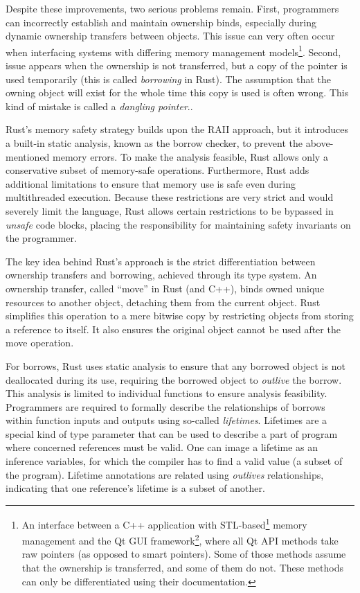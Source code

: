 \documentclass[
  11pt,
  twoside,symmetric]{report}
\DeclareRobustCommand{\href}[2]{#2\footnote{\url{#1}}}
\begin{document}
Despite these improvements, two serious problems remain. First,
programmers can incorrectly establish and maintain ownership binds,
especially during dynamic ownership transfers between objects. This
issue can very often occur when interfacing systems with differing
memory management models\footnote{An interface between a C++ application
  with
  \href{https://www.cppreference.com/Cpp_STL_ReferenceManual.pdf}{STL-based}
  memory management and the \href{https://www.qt.io/}{Qt GUI framework},
  where all Qt API methods take raw pointers (as opposed to smart
  pointers). Some of those methods assume that the ownership is
  transferred, and some of them do not. These methods can only be
  differentiated using their documentation.}. Second, issue appears when
the ownership is not transferred, but a copy of the pointer is used
temporarily (this is called \emph{borrowing} in Rust). The assumption
that the owning object will exist for the whole time this copy is used
is often wrong. This kind of mistake is called a \emph{dangling
pointer}..

Rust's memory safety strategy builds upon the RAII approach, but it
introduces a built-in static analysis, known as the borrow checker, to
prevent the above-mentioned memory errors. To make the analysis
feasible, Rust allows only a conservative subset of memory-safe
operations. Furthermore, Rust adds additional limitations to ensure that
memory use is safe even during multithreaded execution. Because these
restrictions are very strict and would severely limit the language, Rust
allows certain restrictions to be bypassed in \emph{unsafe} code blocks,
placing the responsibility for maintaining safety invariants on the
programmer.

The key idea behind Rust's approach is the strict differentiation
between ownership transfers and borrowing, achieved through its type
system. An ownership transfer, called ``move'' in Rust (and C++), binds
owned unique resources to another object, detaching them from the
current object. Rust simplifies this operation to a mere bitwise copy by
restricting objects from storing a reference to itself. It also ensures
the original object cannot be used after the move operation.

For borrows, Rust uses static analysis to ensure that any borrowed
object is not deallocated during its use, requiring the borrowed object
to \emph{outlive} the borrow. This analysis is limited to individual
functions to ensure analysis feasibility. Programmers are required to
formally describe the relationships of borrows within function inputs
and outputs using so-called \emph{lifetimes}. Lifetimes are a special
kind of type parameter that can be used to describe a part of program
where concerned references must be valid. One can image a lifetime as an
inference variables, for which the compiler has to find a valid value (a
subset of the program). Lifetime annotations are related using
\emph{outlives} relationships, indicating that one reference's lifetime
is a subset of another.
\end{document}
